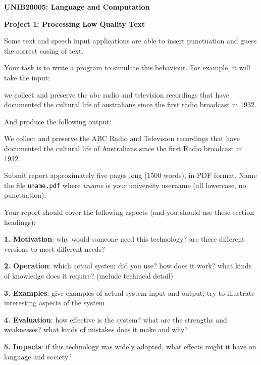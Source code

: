 \documentclass[a4paper,10pt]{article}
\begin{document}
\centerline{\LARGE\bf UNIB20005: Language and Computation}\vspace{2ex}

\centerline{\large\bf Project 1: Processing Low Quality Text}\vspace{2ex}
\vfil

Some text and speech input applications are able to insert punctuation and guess the correct casing of text.

Your task is to write a program to simulate this behaviour. For example, it will take
the input:
\begin{blockquote}
we collect and preserve the abc radio and television recordings that have documented the cultural life of australians since the first radio broadcast in 1932.
\end{blockquote}

And produce the following output:

\begin{blockquote}
We collect and preserve the ABC Radio and Television recordings that have documented the cultural life of Australians since the first Radio broadcast in 1932.
\end{blockquote}









Submit report approximately five pages long (1500 words), in PDF format.
Name the file \texttt{uname.pdf} where \textit{uname} is your university
username (all lowercase, no punctuation).

Your report should cover the following aspects (and you should use these
section headings):
\begin{description}\setlength{\itemsep}{0pt}\setlength{\parskip}{0pt}
\item \textbf{1. Motivation}: why would someone need this technology?  are there
different versions to meet different needs?
\item \textbf{2. Operation}: which actual system did you use?
how does it work?  what kinds of knowledge
does it require?  (include technical detail)
\item \textbf{3. Examples}: give examples of actual system input and output;
try to illustrate interesting aspects of the system
\item \textbf{4. Evaluation}: how effective is the system? what are the strengths
and weaknesses? what kinds of mistakes does it make and why?
\item \textbf{5. Impacts}: if this technology was widely adopted, what effects
might it have on language and society?
\end{description}
\end{document}
